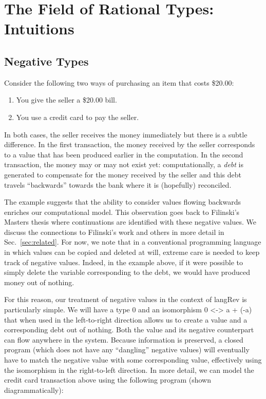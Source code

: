 \documentclass[preprint]{sigplanconf}
\begin{document}
\section{The Field of Rational Types: Intuitions} 

\subsection{Negative Types}

Consider the following two ways of purchasing an item that costs \$20.00:
\begin{enumerate}
\item You give the seller a \$20.00 bill.
\item You use a credit card to pay the seller.
\end{enumerate}
In both cases, the seller receives the money immediately but there is a
subtle difference. In the first transaction, the money received by the seller
corresponds to a value that has been produced earlier in the computation. In
the second transaction, the money may or may not exist yet: computationally,
a \emph{debt} is generated to compensate for the money received by the seller
and this debt travels ``backwards'' towards the bank where it is (hopefully)
reconciled.

The example suggests that the ability to consider values flowing backwards
enriches our computational model. This observation goes back to Filinski's
Masters thesis where continuations are identified with these negative values.
We discuss the connections to Filinski's work and others in more detail in
Sec.~\ref{sec:related}. For now, we note that in a conventional programming
language in which values can be copied and deleted at will, extreme care is
needed to keep track of negative values. Indeed, in the example above, if it
were possible to simply delete the variable corresponding to the debt, we
would have produced money out of nothing. 

For this reason, our treatment of negative values in the context of
{{langRev}} is particularly simple. We will have a type $0$ and an
isomorphism {{0 <-> a + (-a)}} that when used in the left-to-right direction
allows us to create a value and a corresponding debt out of nothing. Both the
value and its negative counterpart can flow anywhere in the system. Because
information is preserved, a closed program (which does not have any
``dangling'' negative values) will eventually have to match the negative
value with some corresponding value, effectively using the isomorphism in the
right-to-left direction. In more detail, we can model the credit card
transaction above using the following program (shown diagrammatically):
\end{document}
